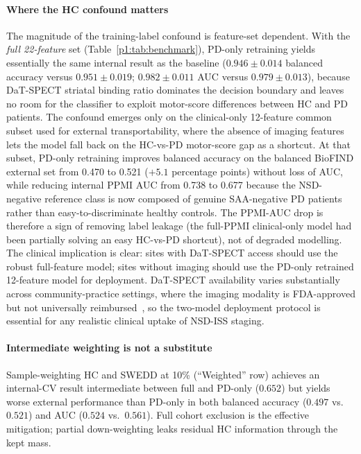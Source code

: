 \paragraph*{Where the HC confound matters} The magnitude of the training-label confound is feature-set dependent. With the \emph{full 22-feature} set (Table~\ref{p1:tab:benchmark}), PD-only retraining yields essentially the same internal result as the baseline ($0.946 \pm 0.014$ balanced accuracy versus $0.951 \pm 0.019$; $0.982 \pm 0.011$ AUC versus $0.979 \pm 0.013$), because DaT-SPECT striatal binding ratio dominates the decision boundary and leaves no room for the classifier to exploit motor-score differences between HC and PD patients. The confound emerges only on the clinical-only 12-feature common subset used for external transportability, where the absence of imaging features lets the model fall back on the HC-vs-PD motor-score gap as a shortcut. At that subset, PD-only retraining improves balanced accuracy on the balanced BioFIND external set from 0.470 to 0.521 ($+5.1$ percentage points) without loss of AUC, while reducing internal PPMI AUC from 0.738 to 0.677 because the NSD-negative reference class is now composed of genuine SAA-negative PD patients rather than easy-to-discriminate healthy controls. The PPMI-AUC drop is therefore a sign of removing label leakage (the full-PPMI clinical-only model had been partially solving an easy HC-vs-PD shortcut), not of degraded modelling. The clinical implication is clear: sites with DaT-SPECT access should use the robust full-feature model; sites without imaging should use the PD-only retrained 12-feature model for deployment. DaT-SPECT availability varies substantially across community-practice settings, where the imaging modality is FDA-approved but not universally reimbursed~\cite{seibyl2018dat}, so the two-model deployment protocol is essential for any realistic clinical uptake of NSD-ISS staging.

\paragraph*{Intermediate weighting is not a substitute} Sample-weighting HC and SWEDD at 10\% (``Weighted'' row) achieves an internal-CV result intermediate between full and PD-only ($0.652$) but yields worse external performance than PD-only in both balanced accuracy ($0.497$ vs.\ $0.521$) and AUC ($0.524$ vs.\ $0.561$). Full cohort exclusion is the effective mitigation; partial down-weighting leaks residual HC information through the kept mass.

